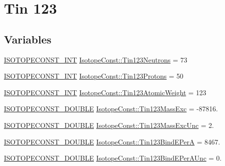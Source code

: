 \hypertarget{group___isotope_const-_tin-_sn123}{}\section{Tin 123}
\label{group___isotope_const-_tin-_sn123}
\subsection*{Variables}
\begin{DoxyCompactItemize}
\item 
\mbox{\hyperlink{group___isotope_const-_macros_ga5f18360b3e99483a35c32d789e62621c}{I\+S\+O\+T\+O\+P\+E\+C\+O\+N\+S\+T\+\_\+\+I\+NT}} \mbox{\hyperlink{group___isotope_const-_tin-_sn123_ga6187d4128a5ffd681e42a90c3fff8caf}{Isotope\+Const\+::\+Tin123\+Neutrons}} = 73
\item 
\mbox{\hyperlink{group___isotope_const-_macros_ga5f18360b3e99483a35c32d789e62621c}{I\+S\+O\+T\+O\+P\+E\+C\+O\+N\+S\+T\+\_\+\+I\+NT}} \mbox{\hyperlink{group___isotope_const-_tin-_sn123_ga378ce3b2e647c34d3b91c2a8dbd91c82}{Isotope\+Const\+::\+Tin123\+Protons}} = 50
\item 
\mbox{\hyperlink{group___isotope_const-_macros_ga5f18360b3e99483a35c32d789e62621c}{I\+S\+O\+T\+O\+P\+E\+C\+O\+N\+S\+T\+\_\+\+I\+NT}} \mbox{\hyperlink{group___isotope_const-_tin-_sn123_ga694bf55061d4bac63d7504cd21e1f35e}{Isotope\+Const\+::\+Tin123\+Atomic\+Weight}} = 123
\item 
\mbox{\hyperlink{group___isotope_const-_macros_ga8f45a7272ce02c0b4c65c44636ed719a}{I\+S\+O\+T\+O\+P\+E\+C\+O\+N\+S\+T\+\_\+\+D\+O\+U\+B\+LE}} \mbox{\hyperlink{group___isotope_const-_tin-_sn123_ga1c08706ea8c41f410ebd48ba918fb1d0}{Isotope\+Const\+::\+Tin123\+Mass\+Exc}} = -\/87816.
\item 
\mbox{\hyperlink{group___isotope_const-_macros_ga8f45a7272ce02c0b4c65c44636ed719a}{I\+S\+O\+T\+O\+P\+E\+C\+O\+N\+S\+T\+\_\+\+D\+O\+U\+B\+LE}} \mbox{\hyperlink{group___isotope_const-_tin-_sn123_ga23715817b7db268137b85fb339b3e089}{Isotope\+Const\+::\+Tin123\+Mass\+Exc\+Unc}} = 2.
\item 
\mbox{\hyperlink{group___isotope_const-_macros_ga8f45a7272ce02c0b4c65c44636ed719a}{I\+S\+O\+T\+O\+P\+E\+C\+O\+N\+S\+T\+\_\+\+D\+O\+U\+B\+LE}} \mbox{\hyperlink{group___isotope_const-_tin-_sn123_gae0124a95712748a396dc9162b068125b}{Isotope\+Const\+::\+Tin123\+Bind\+E\+PerA}} = 8467.
\item 
\mbox{\hyperlink{group___isotope_const-_macros_ga8f45a7272ce02c0b4c65c44636ed719a}{I\+S\+O\+T\+O\+P\+E\+C\+O\+N\+S\+T\+\_\+\+D\+O\+U\+B\+LE}} \mbox{\hyperlink{group___isotope_const-_tin-_sn123_ga52cc7d728de4b119755d97af4038578e}{Isotope\+Const\+::\+Tin123\+Bind\+E\+Per\+A\+Unc}} = 0.

\end{DoxyCompactItemize}
